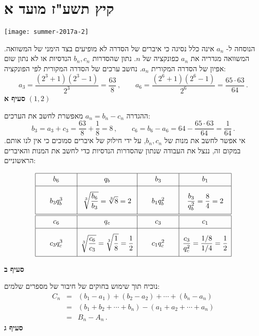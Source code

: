 \np
\section{קיץ תשע"ז מועד א}

\begin{center}
\texttt{[image: summer-2017a-2]}
\end{center}
הנוסחה ל-%
$a_n$
אינה כלל נסיגה כי איברים של הסדרה לא מופיעים בצד הימני של המשוואה. המשוואה מגדריה את
$a_n$
כפונקציה של
$n$.
נתון שהסדרות 
$b_n,c_n$
הנדסיות או לא נתון שום אפיון של הסדרה המקורית
$a_n$.
נחשב ערכים של הסדרה המקורית לפי הפונקציה:
\[
a_3=\frac{(2^3+1)(2^3-1)}{2^3}=\frac{63}{8}\,, \quad\quad a_6=\frac{(2^6+1)(2^6-1)}{2^6}= \frac{65\cdot 63}{64}\,.
\]
\textbf{סעיף א} 
$(1,2)$

ההגדרה
$a_n=b_n-c_n$
מאפשרת לחשב את הערכים:
\[
b_3=a_3+c_3=\frac{63}{8}+\frac{1}{8}=8\,,\quad\quad c_6=b_6-a_6=64-\frac{65\cdot 63}{64}=\frac{1}{64}\,.
\]
אי אפשר לחשב את מנות של
$b_n,c_n$,
על ידי חילוק של איברים סמוכים כי אין לנו אותם. במקום זה, ננצל את העבודה שנתון שהסדרות הנדסיות כדי לחשב את המנות והאיברים הראשוניים:

\[
\begin{array}{|@{\hspace{2em}}c@{\hspace{2em}}|c|@{\hspace{2em}}c@{\hspace{2em}}|c|}
\hline
\rule[-1.5ex]{0pt}{4ex}b_6&q_b&b_3&b_1\\\hline
\rule[-3.5ex]{0pt}{9ex}b_3q_b^3 & \displaystyle\sqrt[3]{\frac{b_6}{b_3}}=\sqrt[3]{8}=2&
b_1 q_b^2 & \displaystyle\frac{b_3}{q_b^2}=\frac{8}{4}=2\\\hline\hline
\rule[-1.5ex]{0pt}{4ex}c_6&q_c&c_3&c_1\\\hline
c_3q_c^3 & \displaystyle\sqrt[3]{\frac{c_6}{c_3}} =\sqrt[3]{\frac{1}{8}} = \frac{1}{2}&
\rule[-3.5ex]{0pt}{9ex}c_1 q_c^2 & \displaystyle\frac{c_3}{q_c^2}=\frac{1/8}{1/4}=\frac{1}{2}\\
\hline
\end{array}
\]

\textbf{סעיף ב}

נוכיח תוך שימוש בחוקים של חיבור של מספרים שלמים:
\begin{eqnarray*}
C_n &=& (b_1-a_1) + (b_2 - a_2) + \cdots + (b_n-a_n)\\
&=&(b_1 + b_2 + \cdots + b_n) - (a_1 + a_2 + \cdots + a_n)\\
&=& B_n - A_n\,.
\end{eqnarray*}
\textbf{סעיף ג}

